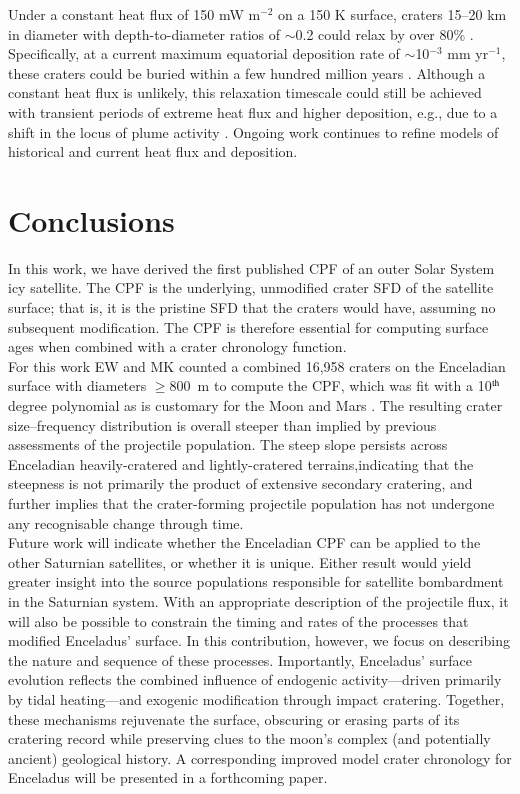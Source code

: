 \documentclass[preprint,11pt,3p,times,authoryear]{elsarticle}
\begin{document}
Under a constant heat flux of 150 mW m$^{-2}$ on a 150 K surface, craters 15–20 km in diameter with depth-to-diameter ratios of $\sim$0.2 could relax by over 80\% . Specifically, at a current maximum equatorial deposition rate of $\sim$10$^{-3}$ mm yr$^{-1}$, these craters could be buried within a few hundred million years \citep{Bland2012}. Although a constant heat flux is unlikely, this relaxation timescale could still be achieved with transient periods of extreme heat flux and higher deposition, e.g., due to a shift in the locus of plume activity \citep{Bland2012}. Ongoing work continues to refine models of historical and current heat flux and deposition.

\section{Conclusions}
\label{sect:conclusion}
In this work, we have derived the first published CPF of an outer Solar System icy satellite. The CPF is the underlying, unmodified crater SFD of the satellite surface; that is, it is the pristine SFD that the craters would have, assuming no subsequent modification. The CPF is therefore essential for computing surface ages when combined with a crater chronology function. \\

For this work EW and MK counted a combined 16,958 craters on the Enceladian surface with diameters $\ge$800~m to compute the CPF, which was fit with a 10$^{\rm th}$ degree polynomial as is customary for the Moon and Mars \citep{Neukum1975, Neukum2001,Ivanov2001}.
The resulting crater size–frequency distribution is overall steeper than implied by previous assessments of the projectile population. The steep slope persists across Enceladian heavily-cratered and lightly-cratered terrains,indicating that the steepness is not primarily the product of extensive secondary cratering, and further implies that the crater-forming projectile population has not undergone any recognisable change through time.\\

Future work will indicate whether the Enceladian CPF can be applied to the other Saturnian satellites, or whether it is unique. Either result would yield greater insight into the source populations responsible for satellite bombardment in the Saturnian system.
With an appropriate description of the projectile flux, it will also be possible to constrain the timing and rates of the processes that modified Enceladus’ surface. In this contribution, however, we focus on describing the nature and sequence of these processes. Importantly, Enceladus’ surface evolution reflects the combined influence of endogenic activity—driven primarily by tidal heating—and exogenic modification through impact cratering. Together, these mechanisms rejuvenate the surface, obscuring or erasing parts of its cratering record while preserving clues to the moon’s complex (and potentially ancient) geological history. A corresponding improved model crater chronology for Enceladus will be presented in a forthcoming paper.
\end{document}

